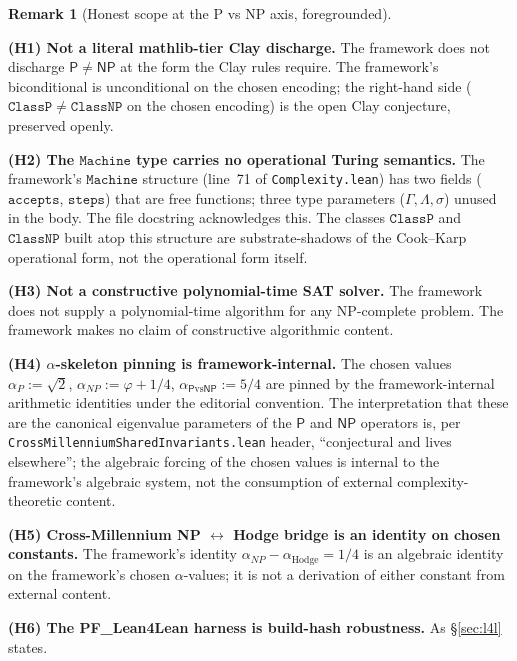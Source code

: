 \documentclass[11pt,a4paper]{article}
\theoremstyle{plain}
\theoremstyle{definition}
\newtheorem{remark}[theorem]{Remark}
\begin{document}
\begin{remark}[Honest scope at the P vs NP axis, foregrounded]
\label{rem:honest-scope-pnp}

\textbf{(H1) Not a literal mathlib-tier Clay discharge.} The framework
does not discharge $\mathsf{P} \neq \mathsf{NP}$ at the form the Clay
rules require. The framework's biconditional is unconditional on the
chosen encoding; the right-hand side ($\mathtt{ClassP} \neq
\mathtt{ClassNP}$ on the chosen encoding) is the open Clay
conjecture, preserved openly.

\textbf{(H2) The $\mathtt{Machine}$ type carries no operational Turing
semantics.} The framework's $\mathtt{Machine}$ structure (line~71 of
\texttt{Complexity.lean}) has two fields ($\mathtt{accepts}$,
$\mathtt{steps}$) that are free functions; three type parameters
($\Gamma, \Lambda, \sigma$) unused in the body. The file docstring
acknowledges this. The classes $\mathtt{ClassP}$ and $\mathtt{ClassNP}$
built atop this structure are substrate-shadows of the Cook--Karp
operational form, not the operational form itself.

\textbf{(H3) Not a constructive polynomial-time SAT solver.} The
framework does not supply a polynomial-time algorithm for any
NP-complete problem. The framework makes no claim of constructive
algorithmic content.

\textbf{(H4) $\alpha$-skeleton pinning is framework-internal.} The
chosen values $\alpha_{P} := \sqrt{2}$, $\alpha_{NP} := \varphi +
1/4$, $\alpha_{\mathsf{P}\mathrm{vs}\mathsf{NP}} := 5/4$ are pinned
by the framework-internal arithmetic identities under the editorial
convention. The interpretation that these are the canonical
eigenvalue parameters of the $\mathsf{P}$ and $\mathsf{NP}$
operators is, per \texttt{CrossMillenniumSharedInvariants.lean}
header, ``conjectural and lives elsewhere''; the algebraic forcing of
the chosen values is internal to the framework's algebraic system,
not the consumption of external complexity-theoretic content.

\textbf{(H5) Cross-Millennium NP $\leftrightarrow$ Hodge bridge is an
identity on chosen constants.} The framework's identity
$\alpha_{NP} - \alpha_{\mathrm{Hodge}} = 1/4$ is an algebraic identity
on the framework's chosen $\alpha$-values; it is not a derivation of
either constant from external content.

\textbf{(H6) The PF\_Lean4Lean harness is build-hash robustness.} As
\S\ref{sec:l4l} states.
\end{remark}
\end{document}

